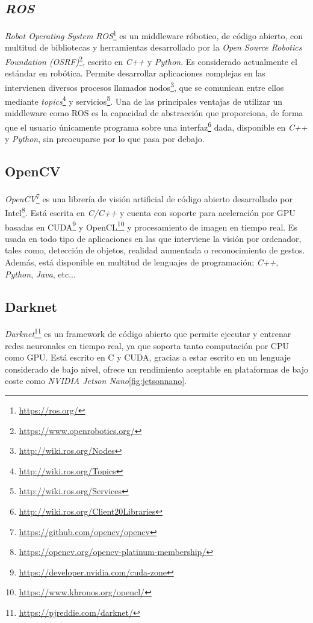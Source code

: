 \subsection{\textit{ROS}}
\textit{Robot Operating System ROS}\footnote{\url{https://ros.org/}} es un middleware róbotico, de código abierto, con multitud de bibliotecas y herramientas desarrollado por la \textit{Open Source Robotics Foundation (OSRF)}\footnote{\url{https://www.openrobotics.org/}}, escrito en \textit{C++} y \textit{Python}. Es considerado actualmente el estándar en robótica. Permite desarrollar aplicaciones complejas en las intervienen diversos procesos llamados nodos\footnote{\url{http://wiki.ros.org/Nodes}}, que se comunican entre ellos mediante \textit{topics}\footnote{\url{http://wiki.ros.org/Topics}} y servicios\footnote{\url{http://wiki.ros.org/Services}}. Una de las principales ventajas de utilizar un middleware como ROS es la capacidad de abstracción que proporciona, de forma que el usuario únicamente programa sobre una interfaz\footnote{\url{http://wiki.ros.org/Client20Libraries}} dada, disponible en \textit{C++} y \textit{Python}, sin preocuparse por lo que pasa por debajo.\\

\subsection{OpenCV}
\textit{OpenCV}\footnote{\url{https://github.com/opencv/opencv}} es una librería de visión artificial de código abierto desarrollado por Intel\footnote{\url{https://opencv.org/opencv-platinum-membership/}}. Está escrita en \textit{C/C++} y cuenta con soporte para aceleración por GPU basadas en CUDA\footnote{\url{https://developer.nvidia.com/cuda-zone}} y OpenCL\footnote{\url{https://www.khronos.org/opencl/}} y procesamiento de imagen en tiempo real. Es usada en todo tipo de aplicaciones en las que interviene la visión por ordenador, tales como, detección de objetos, realidad aumentada o reconocimiento de gestos. Además, está disponible en multitud de lenguajes de programación; \textit{C++}, \textit{Python}, \textit{Java}, etc...\\

\subsection{Darknet}
\textit{Darknet}\footnote{\url{https://pjreddie.com/darknet/}} es un framework de código abierto que permite ejecutar y entrenar redes neuronales en tiempo real, ya que soporta tanto computación por CPU como GPU. Está escrito en C y CUDA, gracias a estar escrito en un lenguaje considerado de bajo nivel, ofrece un rendimiento aceptable en plataformas de bajo coste como \textit{NVIDIA Jetson Nano}\ref{fig:jetsonnano}.\\

